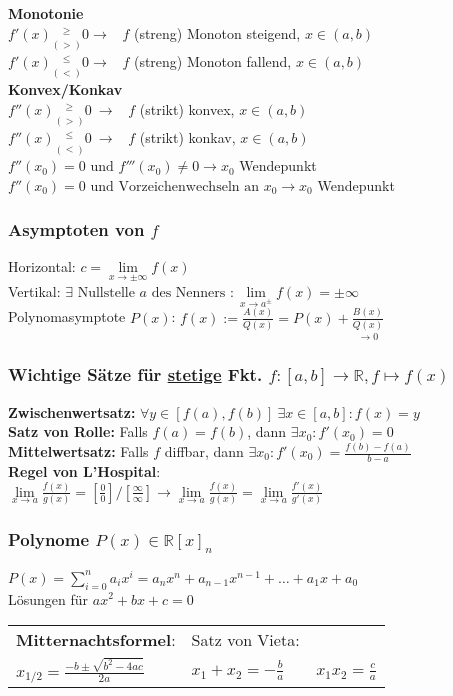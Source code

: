 \documentclass[6pt,a4paper]{scrartcl}
\newcommand{\ra}[0]{\ensuremath{\rightarrow}}
\begin{document}
\begin{multicols*}{4}
\textbf{Monotonie} \\
$f'(x) \underset{(>)}{^{\ge}} 0 \rightarrow$ \ $f$ (streng) Monoton steigend, $x\in(a,b)$\\
$f'(x) \underset{(<)}{^{\le}} 0 \rightarrow$ \ $f$ (streng) Monoton fallend, $x\in(a,b)$\\
\textbf{Konvex/Konkav} \\
$f''(x) \underset{(>)}{^{\ge}} 0 \ \rightarrow$ \ $f$ (strikt) konvex, $x\in(a,b)$\\
$f''(x) \underset{(<)}{^{\le}} 0 \ \rightarrow$ \ $f$ (strikt) konkav, $x\in(a,b)$\\
$f''(x_0)=0 \text{ und } f'''(x_0) \ne 0 \rightarrow x_0$ Wendepunkt \\
$f''(x_0)=0 \text{ und Vorzeichenwechseln an } x_0 \rightarrow x_0$ Wendepunkt \\
\subsubsection{Asymptoten von $f$}
Horizontal: $c=\lim\limits_{x\ra \pm \infty} f(x)$\\
Vertikal: $\exists \text{ Nullstelle } a \text{ des Nenners }: \lim\limits_{x \rightarrow a^{\pm}} f(x) = \pm \infty$\\
Polynomasymptote $P(x)$: $f(x):=\frac{A(x)}{Q(x)}=P(x)+ \underset{\ra 0}{\frac{B(x)}{Q(x)}}$ \\
\subsubsection{Wichtige Sätze für \underline{stetige} Fkt. $f: [a,b] \rightarrow \mathbb R, f \mapsto f(x)$ }
\textbf{Zwischenwertsatz:} $\forall y \in [f(a),f(b)]\ \exists x\in [a,b]:f(x)=y$\\
\textbf{Satz von Rolle:} Falls $f(a)=f(b)$, dann $\exists x_0: f' (x_0) = 0$\\
\textbf{Mittelwertsatz:} Falls $f$ diffbar, dann $\exists x_0:f'(x_0)=\frac{f(b)-f(a)}{b-a}$\\
\textbf{Regel von L'Hospital}:\\ $\lim\limits_{x \rightarrow a} \frac{f(x)}{g(x)} = \left[ \frac{0}{0} \right] / \left[ \frac{\infty}{\infty} \right] \rightarrow \lim\limits_{x \rightarrow a} \frac{f(x)}{g(x)} = \lim\limits_{x \rightarrow a} \frac{f'(x)}{g'(x)}$

\subsubsection{Polynome $P(x)\in\mathbb R[x]_n$}
$P(x)=\sum_{i=0}^n a_ix^i=a_n x^n+a_{n-1} x^{n-1}+\dotsc+a_1x+a_0$ \\
Lösungen für $ax^2+bx+c=0$ \\
\begin{tabular}{l|l}
\textbf{Mitternachtsformel}:  &  Satz von Vieta:\\
$x_{1/2}=\frac{-b\pm\sqrt{b^2-4ac}}{2a}$  \quad & \quad   $x_1 + x_2 = - \frac{b}{a} \qquad x_1 x_2 = \frac{c}{a}$
\end{tabular}


\end{multicols*}
\end{document}
